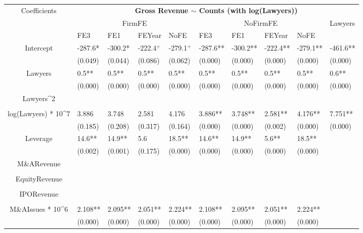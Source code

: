\documentclass{article}
\begin{document}
\begin{table}[H]
\centering
\begin{tabular}{|clllllllll|}
\hline
\multirow{3}{*}{Coefficients} & \multicolumn{9}{c|}{\textbf{Gross Revenue $\sim$ Counts (with log(Lawyers))}} \\
\cline{2-10}
& \multicolumn{4}{c}{FirmFE} & \multicolumn{4}{c}{NoFirmFE} & \multirow{2}{*}{Lawyers} \\
\cline{2-9}
& FE3 & FE1 & FEYear & NoFE & FE3 & FE1 & FEYear & NoFE &  \\
\hline
 
Intercept & -287.6* & -300.2* & -222.4$^{+}$ & -279.1$^{+}$ & -287.6** & -300.2** & -222.4** & -279.1** & -461.6** \\ 
   & (0.049) & (0.044) & (0.086) & (0.062) & (0.000) & (0.000) & (0.000) & (0.000) & (0.000) \\ 
  Lawyers & 0.5** & 0.5** & 0.5** & 0.5** & 0.5** & 0.5** & 0.5** & 0.5** & 0.6** \\ 
   & (0.000) & (0.000) & (0.000) & (0.000) & (0.000) & (0.000) & (0.000) & (0.000) & (0.000) \\ 
  Lawyers^2 &  &  &  &  &  &  &  &  &  \\ 
   &  &  &  &  &  &  &  &  &  \\ 
  log(Lawyers) * 10^7 & 3.886 & 3.748 & 2.581 & 4.176 & 3.886** & 3.748** & 2.581** & 4.176** & 7.751** \\ 
   & (0.185) & (0.208) & (0.317) & (0.164) & (0.000) & (0.000) & (0.002) & (0.000) & (0.000) \\ 
  Leverage & 14.6** & 14.9** & 5.6 & 18.5** & 14.6** & 14.9** & 5.6** & 18.5** &  \\ 
   & (0.002) & (0.001) & (0.175) & (0.000) & (0.000) & (0.000) & (0.000) & (0.000) &  \\ 
  M\&ARevenue &  &  &  &  &  &  &  &  &  \\ 
   &  &  &  &  &  &  &  &  &  \\ 
  EquityRevenue &  &  &  &  &  &  &  &  &  \\ 
   &  &  &  &  &  &  &  &  &  \\ 
  IPORevenue &  &  &  &  &  &  &  &  &  \\ 
   &  &  &  &  &  &  &  &  &  \\ 
  M\&AIssues * 10^6 & 2.108** & 2.095** & 2.051** & 2.224** & 2.108** & 2.095** & 2.051** & 2.224** &  \\ 
   & (0.000) & (0.000) & (0.000) & (0.000) & (0.000) & (0.000) & (0.000) & (0.000) &  \\ 

\end{tabular}
\end{table}
\end{document}
